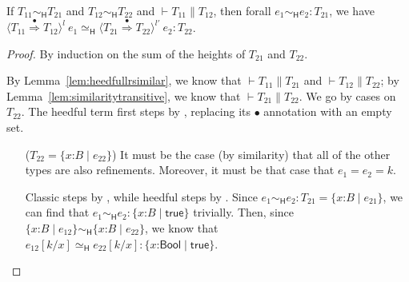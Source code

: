 \documentclass[9pt]{extarticle}
\newcommand{\ottnt}[1]{\mathit{#1}}
\newcommand{\ottsym}[1]{#1}
\begin{document}
{\begin{lemma}
  \label{lem:heedfullrcast}
  If $ \ottnt{T_{{\mathrm{11}}}}   \sim _{  \mathsf{H}  }  \ottnt{T_{{\mathrm{21}}}} $ and $ \ottnt{T_{{\mathrm{12}}}}   \sim _{  \mathsf{H}  }  \ottnt{T_{{\mathrm{22}}}} $ and $\vdash  \ottnt{T_{{\mathrm{11}}}}  \mathrel{\parallel}  \ottnt{T_{{\mathrm{12}}}}$,
  then forall $ \ottnt{e_{{\mathrm{1}}}}   \sim _{  \mathsf{H}  }  \ottnt{e_{{\mathrm{2}}}}  :  \ottnt{T_{{\mathrm{21}}}} $, we have $  \langle  \ottnt{T_{{\mathrm{11}}}}  \mathord{ \overset{\bullet}{\Rightarrow} }  \ottnt{T_{{\mathrm{12}}}}  \rangle^{ \ottnt{l} } ~  \ottnt{e_{{\mathrm{1}}}}    \simeq _{  \mathsf{H}  }   \langle  \ottnt{T_{{\mathrm{21}}}}  \mathord{ \overset{\bullet}{\Rightarrow} }  \ottnt{T_{{\mathrm{22}}}}  \rangle^{ \ottnt{l'} } ~  \ottnt{e_{{\mathrm{2}}}}   :  \ottnt{T_{{\mathrm{22}}}} $.
\begin{proof}
    By induction on the sum of the heights of $\ottnt{T_{{\mathrm{21}}}}$ and
    $\ottnt{T_{{\mathrm{22}}}}$.
{\iffull
    By Lemma~\ref{lem:heedfullrsimilar}, we know that
    $\vdash  \ottnt{T_{{\mathrm{11}}}}  \mathrel{\parallel}  \ottnt{T_{{\mathrm{21}}}}$ and $\vdash  \ottnt{T_{{\mathrm{12}}}}  \mathrel{\parallel}  \ottnt{T_{{\mathrm{22}}}}$; by
    Lemma~\ref{lem:similaritytransitive}, we know that $\vdash  \ottnt{T_{{\mathrm{21}}}}  \mathrel{\parallel}  \ottnt{T_{{\mathrm{22}}}}$. We go by cases on $\ottnt{T_{{\mathrm{22}}}}$.
The heedful term first steps by , replacing its
    $ \bullet $ annotation with an empty set.
\begin{itemize}
    \item[($\ottnt{T_{{\mathrm{22}}}}  \ottsym{=}   \{ \mathit{x} \mathord{:} \ottnt{B} \mathrel{\mid} \ottnt{e_{{\mathrm{22}}}} \} $)] It must be the case (by similarity)
      that all of the other types are also refinements. Moreover, it
      must be that case that $\ottnt{e_{{\mathrm{1}}}}  \ottsym{=}  \ottnt{e_{{\mathrm{2}}}} = \ottnt{k}$.

      Classic steps by , while heedful steps by
      . Since $ \ottnt{e_{{\mathrm{1}}}}   \sim _{  \mathsf{H}  }  \ottnt{e_{{\mathrm{2}}}}  :  \ottnt{T_{{\mathrm{21}}}}  =  \{ \mathit{x} \mathord{:} \ottnt{B} \mathrel{\mid} \ottnt{e_{{\mathrm{21}}}} \} $, we
      can find that $ \ottnt{e_{{\mathrm{1}}}}   \sim _{  \mathsf{H}  }  \ottnt{e_{{\mathrm{2}}}}  :   \{ \mathit{x} \mathord{:} \ottnt{B} \mathrel{\mid}  \mathsf{true}  \}  $ trivially. Then, since
      $  \{ \mathit{x} \mathord{:} \ottnt{B} \mathrel{\mid} \ottnt{e_{{\mathrm{12}}}} \}    \sim _{  \mathsf{H}  }   \{ \mathit{x} \mathord{:} \ottnt{B} \mathrel{\mid} \ottnt{e_{{\mathrm{22}}}} \}  $, we know that $  \ottnt{e_{{\mathrm{12}}}}  [  \ottnt{k} / \mathit{x}  ]    \simeq _{  \mathsf{H}  }   \ottnt{e_{{\mathrm{22}}}}  [  \ottnt{k} / \mathit{x}  ]   :   \{ \mathit{x} \mathord{:}  \mathsf{Bool}  \mathrel{\mid}  \mathsf{true}  \}  $.


\end{itemize}}
\end{proof}
\end{lemma}}
\end{document}
